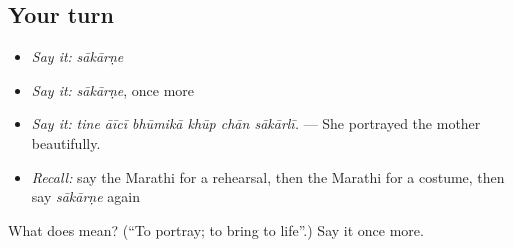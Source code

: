 \subsection*{Your turn}
\begin{itemize}
\raggedright
  \item \emph{Say it:} \emph{sākārṇe}
  \item \emph{Say it:} \emph{sākārṇe}, once more
  \item \emph{Say it:} \emph{tine āīcī bhūmikā khūp chān sākārlī.} — She portrayed the mother beautifully.
  \item \emph{Recall:} say the Marathi for a rehearsal, then the Marathi for a costume, then say \emph{sākārṇe} again
\end{itemize}

\begin{tcolorbox}[breakable,colback=teal!4,colframe=teal!35!black,title={Before you move on}]
What does  mean? (\textquotedblleft{}To portray; to bring to life\textquotedblright{}.) Say it once more.
\end{tcolorbox}
